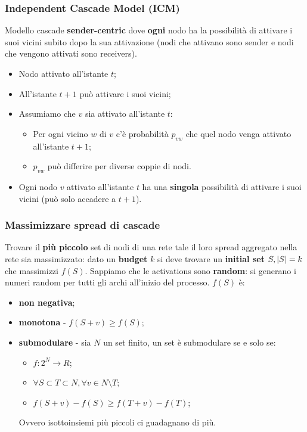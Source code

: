 \documentclass{article}
\begin{document}
    \subsubsection{Independent Cascade Model (ICM)}
      Modello cascade \textbf{sender-centric} dove \textbf{ogni} nodo ha la possibilità di attivare i suoi vicini subito dopo la sua attivazione (nodi che attivano sono sender e nodi che vengono attivati sono receivers).
      \begin{itemize}
          \item Nodo attivato all'istante $t$;
          \item All'istante $t+1$ può attivare i suoi vicini;
          \item Assumiamo che $v$ sia attivato all'istante $t$:
            \begin{itemize}
              \item Per ogni vicino $w$ di $v$ c'è probabilità $p_{vw}$ che quel nodo venga attivato all'istante $t+1$;
              \item $p_{vw}$ può differire per diverse coppie di nodi.
            \end{itemize}
          \item Ogni nodo $v$ attivato all'istante $t$ ha una \textbf{singola} possibilità di attivare i suoi vicini (può solo accadere a $t+1$).
      \end{itemize}
    \subsubsection{Massimizzare spread di cascade}
      Trovare il \textbf{più piccolo} set di nodi di una rete tale il loro spread aggregato nella rete sia massimizzato: dato un \textbf{budget} $k$ si deve trovare un \textbf{initial set} $S, \abs{S}=k$ che massimizzi $f(S)$. Sappiamo che le activations sono \textbf{random}: si generano i numeri random per tutti gli archi all'inizio del processo. $f(S)$ è:
      \begin{itemize}
          \item \textbf{non negativa};
          \item \textbf{monotona} - $f(S+v)\geq f(S)$;
          \item \textbf{submodulare} - sia $N$ un set finito, un set è submodulare se e solo se:
            \begin{itemize}
                \item $f:2^N\rightarrow R$;
                \item $\forall S \subset T \subset N, \forall v\in N \setminus T$;
                \item $f(S+v)-f(S) \geq f(T+v)-f(T)$;
            \end{itemize}
            Ovvero isottoinsiemi più piccoli ci guadagnano di più.
      \end{itemize}
\end{document}
